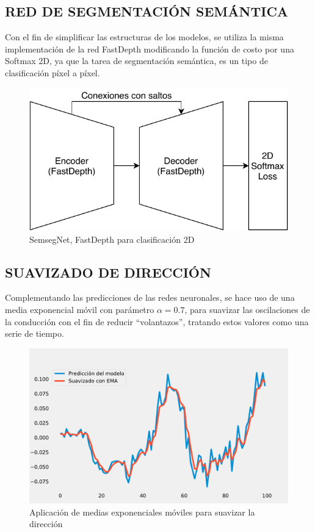 		\inputminted[frame=lines,
		baselinestretch=1,
		fontsize=\footnotesize,
		autogobble]{python}{codigos/marco-aplicativo/depthnet.py}
		
	\subsection{RED DE SEGMENTACIÓN SEMÁNTICA}
		Con el fin de simplificar las estructuras de los modelos, se utiliza la misma implementación de la red FastDepth modificando la función de costo por una Softmax 2D, ya que la tarea de segmentación semántica, es un tipo de clasificación píxel a píxel.
		
		\begin{figure}[H]
			\centering
			\includegraphics[scale=0.55]{imagenes/semsegnet}
			\caption{SemsegNet, FastDepth para clasificación 2D}
			\label{semsegnet}
		\end{figure}
		
	\subsection{SUAVIZADO DE DIRECCIÓN}
		Complementando las predicciones de las redes neuronales, se hace uso de una media exponencial móvil con parámetro $\alpha=0.7$, para suavizar las oscilaciones de la conducción con el fin de reducir ``volantazos'', tratando estos valores como una serie de tiempo.
		
		\begin{figure}[H]
			\centering
			\includegraphics[scale=0.4]{imagenes/ema}
			\caption[Aplicación de medias exponenciales móviles]{Aplicación de medias exponenciales móviles para suavizar la dirección}
			\label{ema}
		\end{figure}
	
